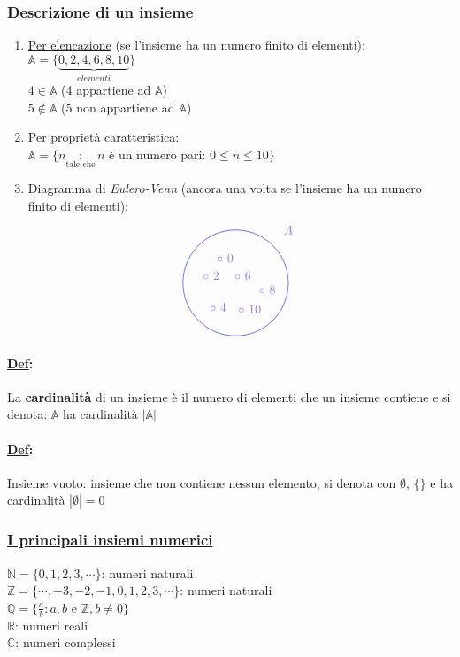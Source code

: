 \documentclass{article}
\newcommand{\ul}[1]{\underline{#1}}
\newcommand{\A}{\mathbb{A}}
\newcommand{\R}{\mathbb{R}}
\newcommand{\Def}[2]{\paragraph{\ul{Def}:}#1\\\hspace*{3em}\begin{minipage}{.8\textwidth}#2\end{minipage}}
\begin{document}
\subsubsection*{\color{green}\ul{Descrizione di un insieme}}
\begin{enumerate}
	\item \ul{Per elencazione} (se l'insieme ha un numero finito di elementi):\\
	      $\A=\{\underbrace{0,2,4,6,8,10}_{elementi}\}$\\
	      $4\in\A$ (4 appartiene ad $\A$)\\
	      $5\notin\A$ (5 non appartiene ad $\A$)
	\item \ul{Per proprietà caratteristica}:\\
	      $\A=\{n\underset{\text{tale che}}{:}n$ è un numero pari: $0\le n\le 10\}$
	\item Diagramma di \textit{Eulero-Venn} (ancora una volta se l'insieme ha un numero finito di elementi):\\
	      \begin{displaymath}
		      \begin{tikzpicture}
			      \begin{scope}[shift={(3cm,-5cm)}, fill opacity=0.5]
				      \draw[blue] (0,0) circle (1.5cm);
				      \draw[blue] (1.5,1.5) node {$A$};
				      \draw[blue] (-0.3,0.7) node {$\circ\ 0$};
				      \draw[blue] (-0.7,0.2) node {$\circ\ 2$};
				      \draw[blue] (-0.5,-0.7) node {$\circ\ 4$};
				      \draw[blue] (0.4,-0.75) node {$\circ\ 10$};
				      \draw[blue] (0.9,-0.2) node {$\circ\ 8$};
				      \draw[blue] (0.2,0.2) node {$\circ\ 6$};
			      \end{scope}
		      \end{tikzpicture}
	      \end{displaymath}
\end{enumerate}
\Def{La \textbf{cardinalità} di un insieme è il numero di elementi che un insieme contiene e si denota: $\A$ ha cardinalità $|\A|$}{}
\Def{Insieme vuoto: insieme che non contiene nessun elemento, si denota con $\emptyset$, $\{\}$ e ha cardinalità $|\emptyset|=0$}{}
\subsubsection*{\color{blue}\ul{I principali insiemi numerici}}
$\mathbb{N}=\{0,1,2,3,\cdots\}$: numeri naturali\\
$\mathbb{Z}=\{\cdots,-3,-2,-1,0,1,2,3,\cdots\}$: numeri naturali\\
$\mathbb{Q}=\{\frac{a}{b}:a,b$ e $\mathbb{Z},b\not=0\}$\\
$\R$: numeri reali\\
$\mathbb{C}$: numeri complessi
\end{document}
